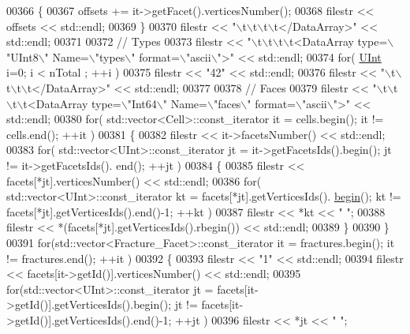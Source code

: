 \begin{DoxyCode}
00366     \{
00367         offsets += it->getFacet().verticesNumber();
00368         filestr << offsets << std::endl;
00369     \}
00370     filestr << \textcolor{stringliteral}{"\(\backslash\)t\(\backslash\)t\(\backslash\)t\(\backslash\)t</DataArray>"} << std::endl;
00371 
00372     \textcolor{comment}{//  Types}
00373     filestr << \textcolor{stringliteral}{"\(\backslash\)t\(\backslash\)t\(\backslash\)t\(\backslash\)t<DataArray type=\(\backslash\)"UInt8\(\backslash\)" Name=\(\backslash\)"types\(\backslash\)" format=\(\backslash\)"ascii\(\backslash\)">"} << std::endl;
00374     \textcolor{keywordflow}{for}( \hyperlink{namespaceFVCode3D_a4bf7e328c75d0fd504050d040ebe9eda}{UInt} i=0; i < nTotal ; ++i )
00375         filestr << \textcolor{stringliteral}{"42"} << std::endl;
00376     filestr << \textcolor{stringliteral}{"\(\backslash\)t\(\backslash\)t\(\backslash\)t\(\backslash\)t</DataArray>"} << std::endl;
00377 
00378     \textcolor{comment}{//  Faces}
00379     filestr << \textcolor{stringliteral}{"\(\backslash\)t\(\backslash\)t\(\backslash\)t\(\backslash\)t<DataArray type=\(\backslash\)"Int64\(\backslash\)" Name=\(\backslash\)"faces\(\backslash\)" format=\(\backslash\)"ascii\(\backslash\)">"} << std::endl;
00380     \textcolor{keywordflow}{for}( std::vector<Cell>::const\_iterator it = cells.begin(); it != cells.end(); ++it )
00381     \{
00382         filestr << it->facetsNumber() << std::endl;
00383         \textcolor{keywordflow}{for}( std::vector<UInt>::const\_iterator jt = it->getFacetsIds().begin(); jt != it->getFacetsIds().
      end(); ++jt )
00384         \{
00385             filestr << facets[*jt].verticesNumber() << std::endl;
00386             \textcolor{keywordflow}{for}( std::vector<UInt>::const\_iterator kt = facets[*jt].getVerticesIds().
      \hyperlink{namespacestd_acec9a198880c12f51f02be95a298a48b}{begin}(); kt != facets[*jt].getVerticesIds().end()-1; ++kt )
00387                 filestr << *kt << \textcolor{stringliteral}{" "};
00388             filestr << *(facets[*jt].getVerticesIds().rbegin()) << std::endl;
00389         \}
00390     \}
00391     \textcolor{keywordflow}{for}(std::vector<Fracture\_Facet>::const\_iterator it = fractures.begin(); it != fractures.end(); ++it )
00392     \{
00393         filestr << \textcolor{stringliteral}{"1"} << std::endl;
00394         filestr << facets[it->getId()].verticesNumber() << std::endl;
00395         \textcolor{keywordflow}{for}(std::vector<UInt>::const\_iterator jt = facets[it->getId()].getVerticesIds().begin(); jt != 
      facets[it->getId()].getVerticesIds().end()-1; ++jt )
00396             filestr << *jt << \textcolor{stringliteral}{" "};

\end{DoxyCode}
